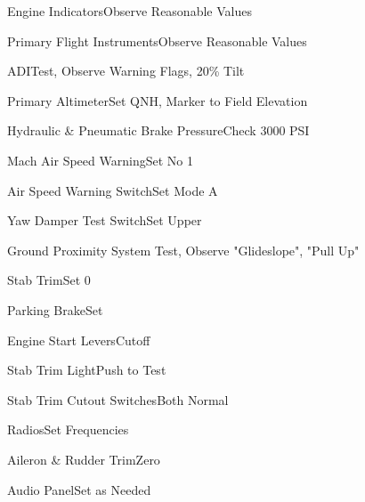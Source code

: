 \documentclass[sim-use]{checklist}
\begin{document}
\begin{continuedchecklist}
    \item {Engine Indicators}{Observe Reasonable Values}
     {
        \item {Primary Flight Instruments}{Observe Reasonable Values}
        \item{ADI}{Test, Observe Warning Flags, 20\% Tilt}
        \item{Primary Altimeter}{Set QNH, Marker to Field Elevation}
    }
    \item {Hydraulic \& Pneumatic Brake Pressure}{Check 3000 PSI}
    \item{Mach Air Speed Warning}{Set No 1}
    \item{Air Speed Warning Switch}{Set Mode A}
    \item{Yaw Damper Test Switch}{Set Upper}
    \item{Ground Proximity System} {Test, Observe "Glideslope", "Pull Up"}
    \item{Stab Trim}{Set 0}
    \item{Parking Brake}{Set}
    \item{Engine Start Levers}{Cutoff}
    \item{Stab Trim Light}{Push to Test}
    \item{Stab Trim Cutout Switches}{Both Normal}
    \item {Radios}{Set Frequencies}
    \item{Aileron \& Rudder Trim}{Zero}
    \item{Audio Panel}{Set as Needed}
\end{continuedchecklist}
\end{document}
